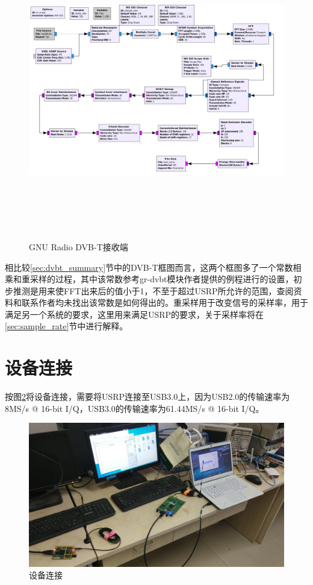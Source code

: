 		\begin{figure}[htbp]
			\centering
			\includegraphics[height=13cm,angle=-90]{figures/dvbt_rx.png}
			\caption{GNU Radio DVB-T接收端}
			\label{fig:gnuradio_dvbt_rx}
		\end{figure}
		\par 相比较\ref{sec:dvbt_summary}节中的DVB-T框图而言，这两个框图多了一个常数相乘和重采样的过程，其中该常数参考gr-dvbt模块作者提供的例程进行的设置，初步推测是用来使FFT出来后的值小于1，不至于超过USRP所允许的范围，查阅资料和联系作者均未找出该常数是如何得出的。重采样用于改变信号的采样率，用于满足另一个系统的要求，这里用来满足USRP的要求，关于采样率将在\ref{sec:sample_rate}节中进行解释。
	\section{设备连接}
		\par 按图\ref{fig:devices}将设备连接，需要将USRP连接至USB3.0上，因为USB2.0的传输速率为8MS/s @ 16-bit I/Q，USB3.0的传输速率为61.44MS/s @ 16-bit I/Q。
		\begin{figure}[htp]
			\centering
			\includegraphics[width=13cm]{figures/devices.jpg}
			\caption{设备连接}
			\label{fig:devices}
		\end{figure}
